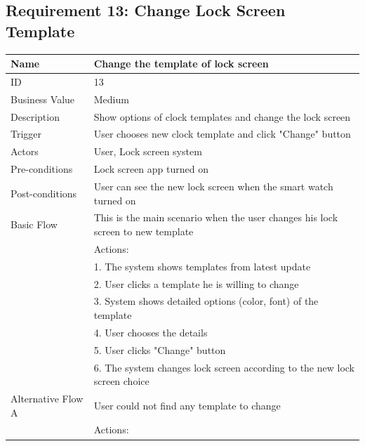 \documentclass{article}
\begin{document}
		\subsection{Requirement 13: Change Lock Screen Template}
		\begin{table}[htbp]
			\centering
			\small
			\begin{tabularx}{\textwidth}{|>{\raggedright\arraybackslash}p{}|X|}
				\hline
				Name             & Change the template of lock screen                                \\ \hline
				ID               & 13                                                                                       \\ \hline
				Business Value   & Medium                                                                                    \\ \hline
				Description      & Show options of clock templates and change the lock screen \\ \hline
				Trigger          & User chooses new clock template and click "Change" button \\ \hline
				Actors           & User, Lock screen system                                \\ \hline
				Pre-conditions   & Lock screen app turned on                                    \\ \hline
				Post-conditions  & User can see the new lock screen when the smart watch turned on                                                        \\ \hline
				Basic Flow       & This is the main scenario when the user changes his lock screen to new template \\ \hline
								 & Actions: \\
								 & 1. The system shows templates from latest update\\
								 & 2. User clicks a template he is willing to change \\
								 & 3. System shows detailed options (color, font) of the template \\
								 & 4. User chooses the details \\
								 & 5. User clicks "Change" button \\
								 & 6. The system changes lock screen according to the new lock screen choice \\ \hline
				Alternative Flow A & User could not find any template to change \\
								 & Actions: \\

\end{tabularx}
\end{table}
\end{document}
